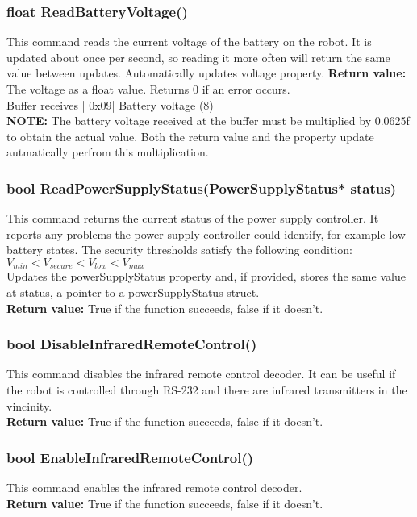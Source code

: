 \documentclass{book}
\begin{document}
\subsubsection{float ReadBatteryVoltage()}
This command reads the current voltage of the battery on the robot. It is updated about once per second, so reading it more often will return the same value between updates. Automatically updates voltage property.
\textbf{Return value:} The voltage as a float value. Returns 0 if an error occurs.\\
Buffer receives | 0x09| Battery voltage (8) |\\
\textbf{NOTE: } The battery voltage received at the buffer must be multiplied by 0.0625f to obtain the actual value. Both the return value and the property update autmatically perfrom this multiplication.\\


\subsubsection{bool ReadPowerSupplyStatus(PowerSupplyStatus* status)}
This command returns the current status of the power supply controller. It reports any problems the power supply controller could identify, for example low battery states. The security thresholds satisfy the following condition:\\
$V_{min} < V_{secure} < V_{low} < V_{max}$\\
Updates the powerSupplyStatus property and, if provided, stores the same value at status, a pointer to a powerSupplyStatus struct.\\
\textbf{Return value: }True if the function succeeds, false if it doesn't.\\ 

\subsubsection{	bool DisableInfraredRemoteControl()}
This command disables the infrared remote control decoder. It can be useful if the robot is controlled through RS-232 and there are infrared transmitters in the vincinity.\\
\textbf{Return value: }True if the function succeeds, false if it doesn't.\\ 

\subsubsection{bool EnableInfraredRemoteControl()}
This command enables the infrared remote control decoder.\\
\textbf{Return value: }True if the function succeeds, false if it doesn't.\\ 
\end{document}
